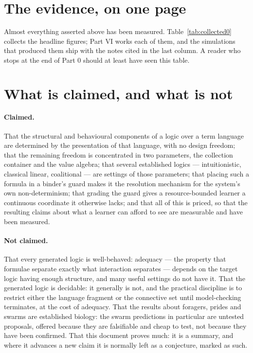 \section{The evidence, on one page}
\label{sec:0evidence}

Almost everything asserted above has been measured. Table~\ref{tab:collected0}
collects the headline figures; Part VI works each of them, and the simulations
that produced them ship with the notes cited in the last column. A reader who
stops at the end of Part 0 should at least have seen this table.

\begin{table}[h]
\centering
\small
\renewcommand{\arraystretch}{1.25}

\caption{The headline measurements. Worked in Part VI.}
\label{tab:collected0}
\end{table}

\section{What is claimed, and what is not}
\label{sec:0claims}

\paragraph{Claimed.} That the structural and behavioural components of a logic
over a term language are determined by the presentation of that language, with no
design freedom; that the remaining freedom is concentrated in two parameters, the
collection container and the value algebra; that several established logics ---
intuitionistic, classical linear, coalitional --- are settings of those
parameters; that placing such a formula in a binder's guard makes it the
resolution mechanism for the system's own non-determinism; that grading the guard
gives a resource-bounded learner a continuous coordinate it otherwise lacks; and
that all of this is priced, so that the resulting claims about what a learner can
afford to see are measurable and have been measured.

\paragraph{Not claimed.} That every generated logic is well-behaved: adequacy ---
the property that formulae separate exactly what interaction separates ---
depends on the target logic having enough structure, and many useful settings do
not have it. That the generated logic is decidable: it generally is not, and the
practical discipline is to restrict either the language fragment or the connective
set until model-checking terminates, at the cost of adequacy. That the results
about foragers, prides and swarms are established biology: the swarm predictions
in particular are untested proposals, offered because they are falsifiable and
cheap to test, not because they have been confirmed. That this document proves
much: it is a summary, and where it advances a new claim it is normally left as a
conjecture, marked as such.

